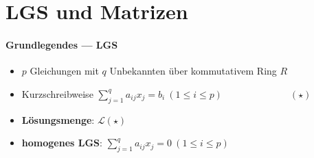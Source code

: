 \section{\label{sec:LGSMatrizen}LGS und Matrizen}

\paragraph{Grundlegendes --- LGS}
\begin{itemize}
  \item $p$ Gleichungen mit $q$ Unbekannten über kommutativem Ring $R$
  \item Kurzschreibweise $\sum_{j=1}^q a_{ij}x_j=b_i \ (1 \leq i \leq p) \qquad\qquad\qquad\quad (\star)$
  \item \textbf{Lösungsmenge}: $\mathcal{L}(\star)$
  \item \textbf{homogenes LGS}: $\sum_{j=1}^q a_{ij}x_j=0 \ (1 \leq i \leq p)$
\end{itemize}

